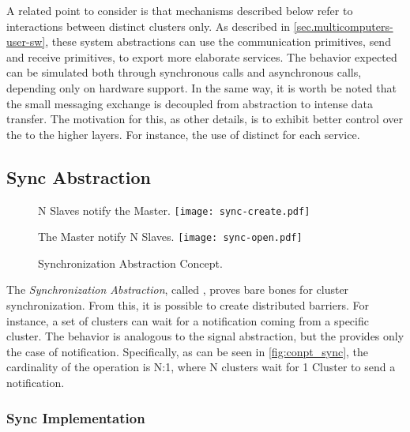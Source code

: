 		A related point to consider is that mechanisms described below refer
		to interactions between distinct clusters only.
		As described in \autoref{sec.multicomputers-user-sw}, these system
		abstractions can use the communication primitives, \ie send and receive
		primitives, to export more elaborate services.
		The behavior expected can be simulated both through synchronous calls
		and asynchronous calls, depending only on hardware support.
		In the same way, it is worth be noted that the small messaging exchange
		is decoupled from abstraction to intense data transfer.
		The motivation for this, as other details, is to exhibit better control
		over the \qos to the higher layers.
		For instance, the use of distinct \nocs for each service.

		\subsection{Sync Abstraction}
		\label{sec.sync-abs}

			\begin{figure}[!tb]
				\centering%
				\caption{Synchronization Abstraction Concept.}%
				\label{fig:conpt_sync}%

					{N Slaves notify the Master.}%
					{\texttt{[image: sync-create.pdf]}}%

				\hfill

					{The Master notify N Slaves.}%
					{\texttt{[image: sync-open.pdf]}}%

			\end{figure}


			The \textit{Synchronization Abstraction}, called \sync, proves bare bones
			for cluster synchronization.
			From this, it is possible to create distributed barriers.
			For instance, a set of clusters can wait for a notification coming
			from a specific cluster.
			The behavior is analogous to the \posix signal abstraction, but the \sync
			provides only the case of notification.
			Specifically, as can be seen in \autoref{fig:conpt_sync}, the
			cardinality of the operation is N:1, where N clusters wait for 1 Cluster
			to send a notification.

			\subsubsection*{Sync Implementation}

